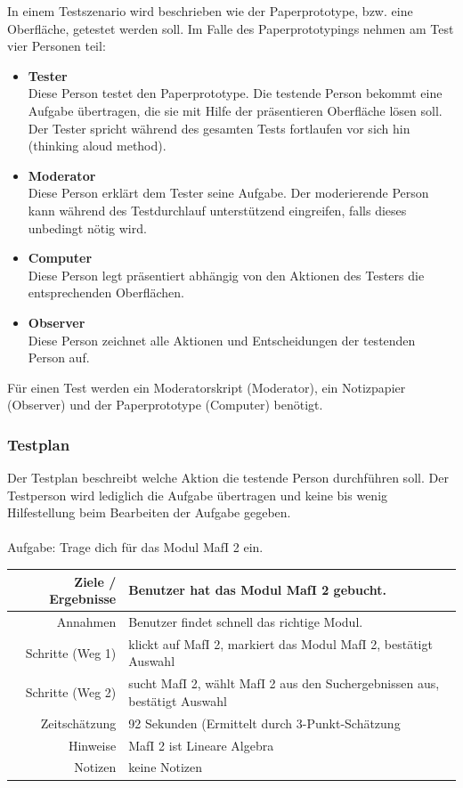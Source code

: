 \documentclass{article}
\begin{document}
In einem Testszenario wird beschrieben wie der Paperprototype, bzw. eine Oberfläche, getestet werden soll. Im Falle des Paperprototypings nehmen am Test vier Personen teil:
\begin{itemize}
\item \textbf{Tester}\\
Diese Person testet den Paperprototype. Die testende Person bekommt eine Aufgabe übertragen, die sie mit Hilfe der präsentieren Oberfläche lösen soll. Der Tester spricht während des gesamten Tests fortlaufen vor sich hin (thinking aloud method).
\item \textbf{Moderator}\\
Diese Person erklärt dem Tester seine Aufgabe. Der moderierende Person kann während des Testdurchlauf unterstützend eingreifen, falls dieses unbedingt nötig wird.
\item \textbf{Computer}\\
Diese Person legt präsentiert abhängig von den Aktionen des Testers die entsprechenden Oberflächen.
\item \textbf{Observer}\\
Diese Person zeichnet alle Aktionen und Entscheidungen der testenden Person auf.
\end{itemize}
Für einen Test werden ein Moderatorskript (Moderator), ein Notizpapier (Observer) und der Paperprototype (Computer) benötigt.

\subsubsection{Testplan}

Der Testplan beschreibt welche Aktion die testende Person durchführen soll. Der Testperson wird lediglich die Aufgabe übertragen und keine bis wenig Hilfestellung beim Bearbeiten der Aufgabe gegeben.\\
\\
Aufgabe: Trage dich für das Modul MafI 2 ein.\\
\begin{tabular}{|r|l|}
\hline
Ziele / Ergebnisse & Benutzer hat das Modul MafI 2 gebucht.\\
\hline
Annahmen & Benutzer findet schnell das richtige Modul.\\
\hline
Schritte (Weg 1) & klickt auf MafI 2, markiert das Modul MafI 2, bestätigt Auswahl\\
Schritte (Weg 2) & sucht MafI 2, wählt MafI 2 aus den Suchergebnissen aus, bestätigt Auswahl\\
\hline
Zeitschätzung & 92 Sekunden (Ermittelt durch 3-Punkt-Schätzung\\
\hline
Hinweise & MafI 2 ist Lineare Algebra\\
\hline
Notizen & keine Notizen\\
\hline
\end{tabular}
\newpage
\end{document}
